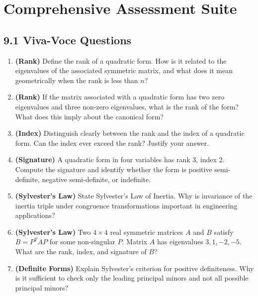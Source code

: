 \documentclass[12pt,a4paper]{article}
\begin{document}
\section{Comprehensive Assessment Suite}

\subsection*{9.1 Viva-Voce Questions}

\begin{enumerate}[label=\textbf{V\arabic*.}, leftmargin=*]
  \item \textbf{(Rank)} Define the rank of a quadratic form. How is it related to the
        eigenvalues of the associated symmetric matrix, and what does it mean geometrically
        when the rank is less than \(n\)?

  \item \textbf{(Rank)} If the matrix associated with a quadratic form has two zero
        eigenvalues and three non-zero eigenvalues, what is the rank of the form? What does
        this imply about the canonical form?

  \item \textbf{(Index)} Distinguish clearly between the rank and the index of a quadratic
        form. Can the index ever exceed the rank? Justify your answer.

  \item \textbf{(Signature)} A quadratic form in four variables has rank 3, index 2.
        Compute the signature and identify whether the form is positive semi-definite,
        negative semi-definite, or indefinite.

  \item \textbf{(Sylvester's Law)} State Sylvester's Law of Inertia. Why is invariance of
        the inertia triple under congruence transformations important in engineering
        applications?

  \item \textbf{(Sylvester's Law)} Two \(4 \times 4\) real symmetric matrices \(A\) and
        \(B\) satisfy \(B = P^T A P\) for some non-singular \(P\). Matrix \(A\) has
        eigenvalues \(3, 1, -2, -5\). What are the rank, index, and signature of \(B\)?

  \item \textbf{(Definite Forms)} Explain Sylvester's criterion for positive definiteness.
        Why is it sufficient to check only the leading principal minors and not all possible
        principal minors?


\end{enumerate}
\end{document}
